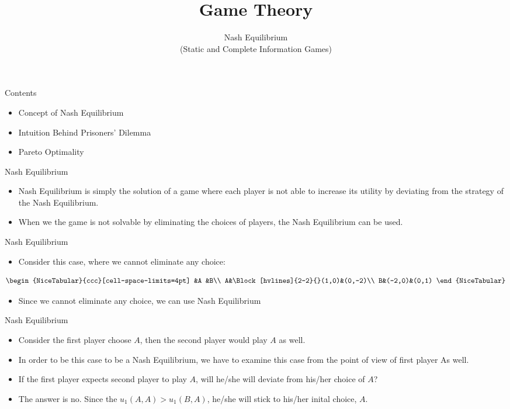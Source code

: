 \documentclass[
  ignorenonframetext,
]{beamer}
\title{Game Theory}
\subtitle{Nash Equilibrium\\
(Static and Complete Information Games)}
\author{}
\date{\vspace{-2.5em}}
\begin{document}
\frame{\titlepage}

\begin{frame}{Contents}
\protect\hypertarget{contents}{}
\begin{itemize}
  \item Concept of Nash Equilibrium
  \item Intuition Behind Prisoners' Dilemma
  \item Pareto Optimality
\end{itemize}
\end{frame}

\begin{frame}{Nash Equilibrium}
\protect\hypertarget{nash-equilibrium}{}
\begin{itemize}
  \item Nash Equilibrium is simply the solution of a game where each player is not able to increase its utility by deviating from the strategy of the Nash Equilibrium.
  \item When we the game is not solvable by eliminating the choices of players, the Nash Equilibrium can be used.
  \end{itemize}
\end{frame}

\begin{frame}{Nash Equilibrium}
\protect\hypertarget{nash-equilibrium-1}{}
\begin{itemize}
\item Consider this case, where we cannot eliminate any choice:
\end{itemize}

\[\begin{NiceTabular}{ccc}[cell-space-limits=4pt]
  &A &B\\
  A&\Block[hvlines]{2-2}{}(1,0)&(0,-2)\\
  B&(-2,0)&(0,1)
  \end{NiceTabular}\]

\begin{itemize}
  \item Since we cannot eliminate any choice, we can use Nash Equilibrium
\end{itemize}
\end{frame}

\begin{frame}{Nash Equilibrium}
\protect\hypertarget{nash-equilibrium-2}{}
\begin{itemize}
  \item Consider the first player choose $A$, then the second player would play $A$ as well.   \item In order to be this case to be a Nash Equilibrium, we have to examine this case from the point of view of first player As well.
  \item If the first player expects second player to play $A$, will he/she will deviate from his/her choice of $A$?
  \item The answer is no. Since the $u_1(A,A)>u_1(B,A)$, he/she will stick to his/her inital choice, $A$.
\end{itemize}
\end{frame}
\end{document}
